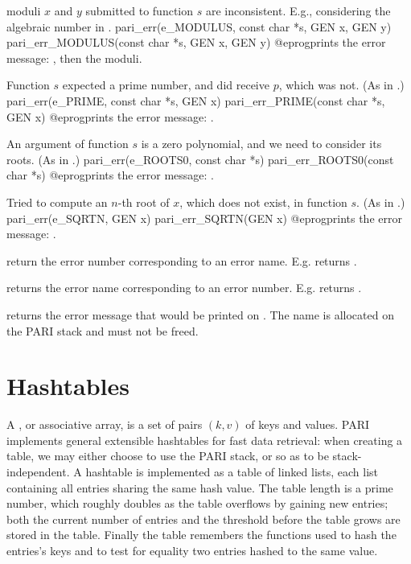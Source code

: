  moduli $x$ and $y$ submitted to function $s$ are
inconsistent. E.g., considering the algebraic number
 in .
\bprog
  pari_err(e_MODULUS, const char *s, GEN x, GEN y)
  pari_err_MODULUS(const char *s, GEN x, GEN y)
@eprog\noindent prints the error message: ,
then the moduli.

 Function $s$ expected a prime number, and did receive $p$,
which was not. (As in .)
\bprog
  pari_err(e_PRIME, const char *s, GEN x)
  pari_err_PRIME(const char *s, GEN x)
@eprog\noindent prints the error message: .

 An argument of function $s$ is a zero polynomial, and
we need to consider its roots. (As in .)
\bprog
  pari_err(e_ROOTS0, const char *s)
  pari_err_ROOTS0(const char *s)
@eprog\noindent prints the error message: .

 Tried to compute an $n$-th root of $x$, which does not
exist, in function $s$.
(As in .)
\bprog
  pari_err(e_SQRTN, GEN x)
  pari_err_SQRTN(GEN x)
@eprog\noindent prints the error message: .


 return the error number corresponding to
an error name. E.g.  returns .

 returns the error name
corresponding to an error number. E.g.  returns
.

 returns the error message that would be
printed on  . The name is allocated on the PARI stack and
must not be freed.

\section{Hashtables}
A , or associative array, is a set of pairs $(k,v)$ of keys
and values. PARI implements general extensible hashtables for fast data
retrieval: when creating a table, we may either choose to use the PARI stack,
or  so as to be stack-independent. A hashtable is implemented as
a table of linked lists, each list containing all entries sharing the same
hash value. The table length is a prime number, which roughly doubles as the
table overflows by gaining new entries; both the current number of entries
and the threshold before the table grows are stored in the table. Finally the
table remembers the functions used to hash the entries's keys and to test for
equality two entries hashed to the same value.

